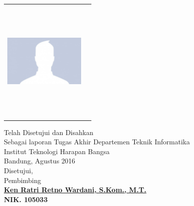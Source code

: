 \begin{center}   
\begin{tabular}{ p{4.5cm}  p{3.5cm}}
 \includegraphics[width=4cm, height =6cm]{images/icon.jpg} &
\vspace{-4cm}{Disusun oleh:\newline Nama: Jovin Angelico \newline NIM	: 1115029}

\end{tabular}
\end{center}
\doublespacing
{\center
\vspace{1cm}
Telah Disetujui dan Disahkan\\ Sebagai laporan Tugas Akhir Departemen Teknik Informatika\\
Institut Teknologi Harapan Bangsa\\[0.5cm]
Bandung,   Agustus 2016\\
Disetujui,\\[0.5cm]
Pembimbing\\[2cm]
\bfseries 
{\underline {Ken Ratri Retno Wardani, S.Kom., M.T.}\\
NIK. 105033\\}}